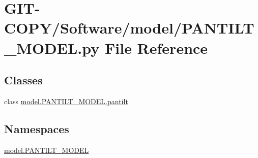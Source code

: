 \hypertarget{GIT-COPY_2Software_2model_2PANTILT__MODEL_8py}{}\section{G\+I\+T-\/\+C\+O\+P\+Y/\+Software/model/\+P\+A\+N\+T\+I\+L\+T\+\_\+\+M\+O\+D\+E\+L.py File Reference}
\label{GIT-COPY_2Software_2model_2PANTILT__MODEL_8py}
\subsection*{Classes}
\begin{DoxyCompactItemize}
\item 
class \hyperlink{classmodel_1_1PANTILT__MODEL_1_1pantilt}{model.\+P\+A\+N\+T\+I\+L\+T\+\_\+\+M\+O\+D\+E\+L.\+pantilt}
\end{DoxyCompactItemize}
\subsection*{Namespaces}
\begin{DoxyCompactItemize}
\item 
 \hyperlink{namespacemodel_1_1PANTILT__MODEL}{model.\+P\+A\+N\+T\+I\+L\+T\+\_\+\+M\+O\+D\+E\+L}
\end{DoxyCompactItemize}
